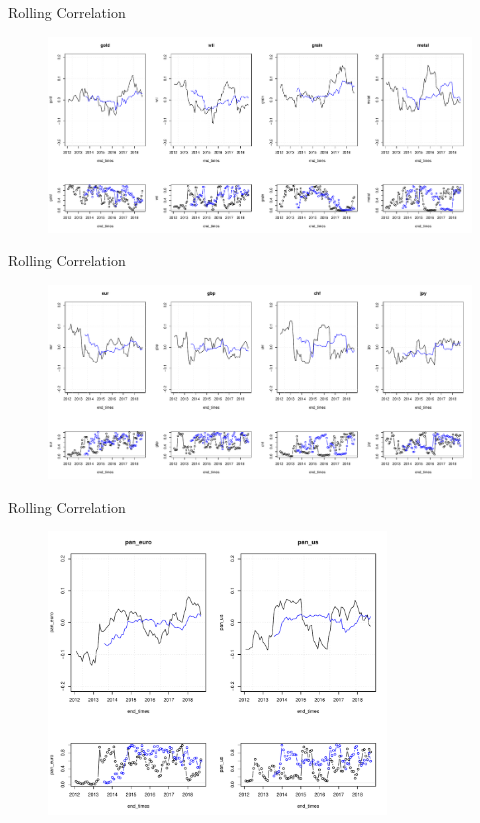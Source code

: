 \documentclass{beamer}
\begin{document}
\begin{frame}{Rolling Correlation}
\begin{figure}
\includegraphics[width=\textwidth]{rolling_commodities.pdf}
\label{roll_stocks}
\end{figure}
\end{frame}

\begin{frame}{Rolling Correlation}
\begin{figure}
\includegraphics[width=\textwidth]{rolling_fx.pdf}
\label{roll_stocks}
\end{figure}
\end{frame}

\begin{frame}{Rolling Correlation}
\begin{figure}
\includegraphics[width=0.8\textwidth]{rolling_bonds.pdf}
\label{roll_stocks}
\end{figure}
\end{frame}
\end{document}
